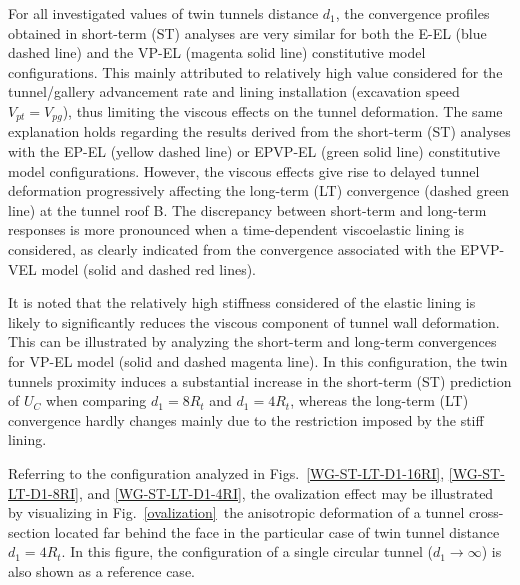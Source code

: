 \documentclass[a4paper,fleqn]{cas-sc}
\begin{document}
\FloatBarrier

For all investigated values of twin tunnels distance $d_1$, the convergence profiles obtained in short-term (ST) analyses are very similar for both the E-EL (blue dashed line) and the VP-EL (magenta solid line) constitutive model configurations. This mainly attributed to relatively high value considered for the tunnel/gallery advancement rate and lining installation (excavation speed $V_{pt}=V_{pg}$), thus limiting the viscous effects on the tunnel deformation. The same explanation holds regarding the results derived from the short-term (ST) analyses with the EP-EL (yellow dashed line) or EPVP-EL (green solid line) constitutive model configurations. However, the viscous effects give rise to delayed tunnel deformation progressively affecting the long-term (LT) convergence (dashed green line) at the tunnel roof B. The discrepancy between short-term and long-term responses is more pronounced when a time-dependent viscoelastic lining is considered, as clearly indicated from the convergence associated with the EPVP-VEL model (solid and dashed red lines).

It is noted that the relatively high stiffness considered of the elastic lining is likely to significantly reduces the viscous component of tunnel wall deformation. This can be illustrated by analyzing the short-term and long-term convergences for VP-EL model (solid and dashed magenta line). In this configuration, the twin tunnels proximity induces a substantial increase in the short-term (ST) prediction of $U_C$ when comparing $d_1=8R_t$ and $d_1=4R_t$, whereas the long-term (LT) convergence hardly changes mainly due to the restriction imposed by the stiff lining.

Referring to the configuration analyzed in Figs.~\ref{WG-ST-LT-D1-16RI}, \ref{WG-ST-LT-D1-8RI}, and \ref{WG-ST-LT-D1-4RI}, the ovalization effect may be illustrated by visualizing in Fig.~\ref{ovalization}~the anisotropic deformation of  a tunnel cross-section located far behind the face  in the particular case of twin tunnel distance $d_1=4R_t$. In this figure, the configuration of a single circular tunnel ($d_1 \rightarrow \infty$) is also shown as a reference case. 
\end{document}
